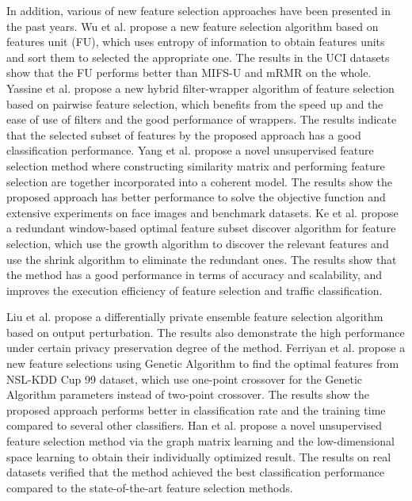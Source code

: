 \documentclass{ieeeaccess}
\theoremstyle{definition}
\begin{document}
In addition, various of new feature selection approaches have been presented in the past years. Wu et al. \cite{Wu2017}propose a new feature selection algorithm based on features unit (FU), which uses entropy of information to obtain features units and sort them to selected the appropriate one. The results in the UCI datasets show that the FU performs better than MIFS-U and mRMR on the whole. Yassine et al.\cite{Yassine2017} propose a new hybrid filter-wrapper algorithm of feature selection based on pairwise feature selection, which benefits from the speed up and the ease of use of filters and the good performance of wrappers. The results indicate that the selected subset of features by the proposed approach has a good classification performance. Yang et al. \cite{Yang2018a} propose a novel unsupervised feature selection method where constructing similarity matrix and performing feature selection are together incorporated into a coherent model. The results show the proposed approach has better performance to solve the objective function and extensive experiments on face images and benchmark datasets. Ke et al. \cite{Ke2018} propose a redundant window-based optimal feature subset discover algorithm for feature selection, which use the growth algorithm to discover the relevant features and use the shrink algorithm to eliminate the redundant ones. The results show that the method has a good performance in terms of accuracy and scalability, and improves the execution efficiency of feature selection and traffic classification.

Liu et al. \cite{Liu2018} propose a differentially private ensemble feature selection algorithm based on output perturbation. The results also demonstrate the high performance under certain privacy preservation degree of the method. Ferriyan et al. \cite{Ferriyan2017} propose a new feature selections using Genetic Algorithm to find the optimal features from NSL-KDD Cup 99 dataset, which use one-point crossover for the Genetic Algorithm parameters instead of two-point crossover. The results show the proposed approach performs better in classification rate and the training time compared to several other classifiers. Han et al. \cite{Han2020} propose a novel unsupervised feature selection method via the graph matrix learning and the low-dimensional space learning to obtain their individually optimized result. The results on real datasets verified that the method achieved the best classification performance compared to the state-of-the-art feature selection methods.
\end{document}

